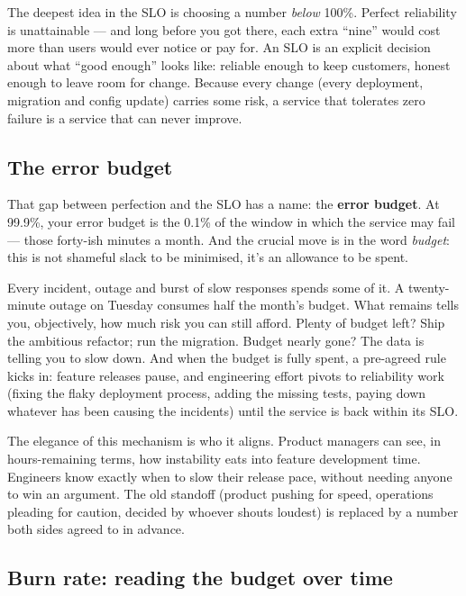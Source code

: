 The deepest idea in the SLO is choosing a number \emph{below} 100\%. Perfect reliability is unattainable — and long before you got there, each extra ``nine'' would cost more than users would ever notice or pay for. An SLO is an explicit decision about what ``good enough'' looks like: reliable enough to keep customers, honest enough to leave room for change. Because every change (every deployment, migration and config update) carries some risk, a service that tolerates zero failure is a service that can never improve.



\subsection{The error budget}


That gap between perfection and the SLO has a name: the \textbf{error budget}. At 99.9\%, your error budget is the 0.1\% of the window in which the service may fail — those forty-ish minutes a month. And the crucial move is in the word \emph{budget}: this is not shameful slack to be minimised, it's an allowance to be spent.


Every incident, outage and burst of slow responses spends some of it. A twenty-minute outage on Tuesday consumes half the month's budget. What remains tells you, objectively, how much risk you can still afford. Plenty of budget left? Ship the ambitious refactor; run the migration. Budget nearly gone? The data is telling you to slow down. And when the budget is fully spent, a pre-agreed rule kicks in: feature releases pause, and engineering effort pivots to reliability work (fixing the flaky deployment process, adding the missing tests, paying down whatever has been causing the incidents) until the service is back within its SLO.


The elegance of this mechanism is who it aligns. Product managers can see, in hours-remaining terms, how instability eats into feature development time. Engineers know exactly when to slow their release pace, without needing anyone to win an argument. The old standoff (product pushing for speed, operations pleading for caution, decided by whoever shouts loudest) is replaced by a number both sides agreed to in advance.



\subsection{Burn rate: reading the budget over time}


